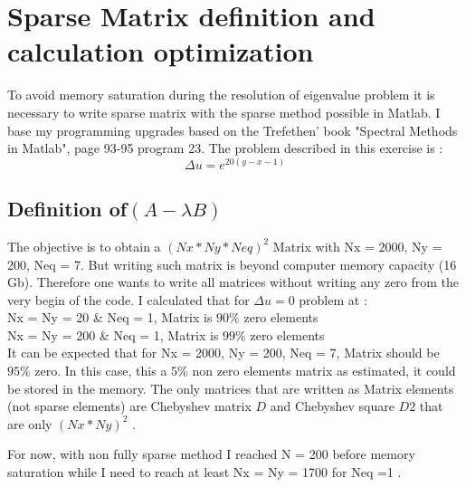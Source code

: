 \documentclass[ border=0pt, a4paper, 11pt]{article}
\numberwithin{equation}{section}
\begin{document}



\section{Sparse Matrix definition and calculation optimization}

To avoid memory saturation during the resolution of eigenvalue problem it is necessary to write sparse matrix with the sparse method possible in Matlab. I base my programming upgrades based on the Trefethen' book "Spectral Methods in Matlab", page 93-95 program 23. The problem described in this exercise is :
\begin{equation}
   \Delta u = e^{20(y-x-1)}
\end{equation}



\subsection{ Definition of$ (A- \lambda B) $ }

The objective is to obtain a $(Nx*Ny*Neq)^2$ Matrix with Nx = 2000, Ny = 200, Neq = 7. But writing such matrix is beyond computer memory capacity (16 Gb).
Therefore one wants to write all matrices without writing any zero from the very begin of the code. 
I calculated that for $\Delta u =0$ problem at :\\
Nx = Ny = 20 \& Neq = 1, Matrix is $90\%$ zero elements\\
Nx = Ny = 200 \& Neq = 1, Matrix is $99\%$ zero elements\\

It can be expected that for Nx = 2000, Ny = 200, Neq = 7, Matrix should be $95\%$ zero.
In this case, this a $5\%$ non zero elements matrix as estimated, it could be stored in the memory.
The only matrices that are written as Matrix elements (not sparse elements) are Chebyshev matrix $D$ and Chebyshev square $D2$ that are only $(Nx*Ny)^2$ .

For now, with non fully sparse method I reached N = 200 before memory saturation while I need to reach at least Nx = Ny = 1700 for Neq =1 .
\end{document}
